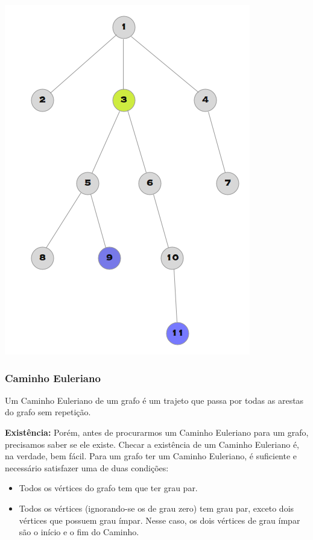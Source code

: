 \documentclass[a4paper,12pt]{article}
\begin{document}
\begin{center}
  \includegraphics[width=\linewidth/2]{figures/grafos/LCA.png}
\end{center}

\subsubsection{Caminho Euleriano}

Um Caminho Euleriano de um grafo é um trajeto que passa por todas as arestas do grafo sem repetição.

\noindent\textbf{Existência:} Porém, antes de procurarmos um Caminho Euleriano para um grafo, precisamos saber se ele existe. Checar a existência de um Caminho Euleriano é, na verdade, bem fácil. Para um grafo ter um Caminho Euleriano, é suficiente e necessário satisfazer uma de duas condições:
\begin{itemize}
    \item Todos os vértices do grafo tem que ter grau par.
    \item Todos os vértices (ignorando-se os de grau zero) tem grau par, exceto dois vértices que possuem grau ímpar. Nesse caso, os dois vértices de grau ímpar são o início e o fim do Caminho.
\end{itemize}
\end{document}
